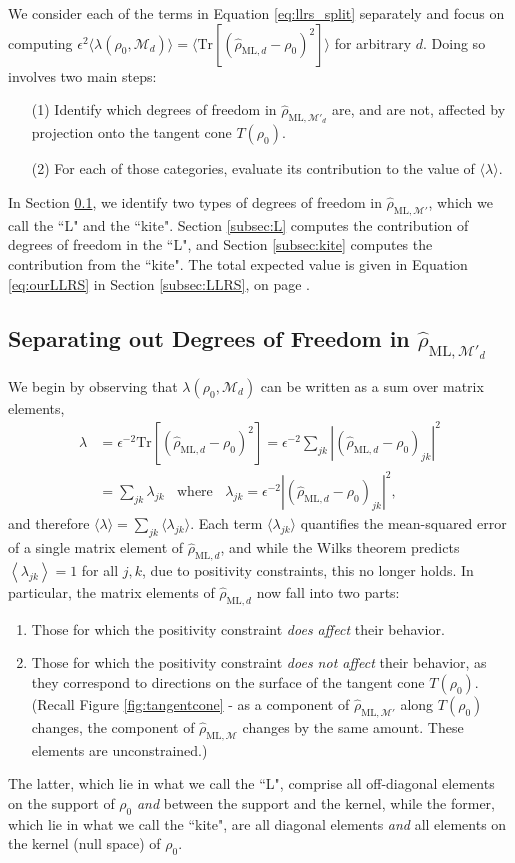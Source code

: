 \documentclass[aps,pra, twocolumn]{revtex4-1}
\newcommand{\M}{\mathcal{M}}
\newcommand{\expect}[1]{\ensuremath{\left\langle#1\right\rangle}}
\newcommand{\rhohat}{\hat{\rho}}
\newcommand{\rhoML}[1]{\rhohat_{\scriptscriptstyle{\mathrm{ML},#1}}}
\begin{document}
We consider each of the terms in Equation \eqref{eq:llrs_split} separately and focus on computing $\epsilon^{2}\langle \lambda(\rho_{0}, \M_{d}) \rangle = \langle \mathrm{Tr}[(\rhoML{d}  - \rho_{0})^{2}] \rangle$ for arbitrary $d$.
Doing so involves two main steps:
\begin{itemize}
\item[(1)] Identify which degrees of freedom in $\rhoML{\M'_{d}}$ are, and are not, affected by projection onto the tangent cone $T(\rho_{0})$.
\item[(2)] For each of those categories, evaluate its contribution to the value of $\langle \lambda \rangle$.
\end{itemize}

In Section \ref{subsec:dof}, we identify two types of degrees of freedom in $\rhoML{\M'}$, which we call the ``L" and the ``kite". Section \ref{subsec:L} computes the contribution of degrees of freedom in the ``L", and Section \ref{subsec:kite} computes the contribution from the ``kite". The total expected value is given in Equation \eqref{eq:ourLLRS} in Section \ref{subsec:LLRS}, on page \pageref{eq:ourLLRS}.

\subsection{Separating out Degrees of Freedom in $\rhoML{\M'_{d}}$}
\label{subsec:dof}
We begin by observing that $\lambda(\rho_{0}, \M_{d})$ can be written as a sum over matrix elements,
\begin{align}
\nonumber \lambda &=\epsilon^{-2}\mathrm{Tr}[(\rhoML{d} - \rho_{0})^{2}] = \epsilon^{-2}\sum_{jk}|(\rhoML{d}- \rho_{0} )_{jk}|^{2}\\
\nonumber &= \sum_{jk}\lambda_{jk}~~~~\text{where}~~~~\lambda_{jk} = \epsilon^{-2}|(\rhoML{d} - \rho_{0} )_{jk} |^{2},
\end{align}
and therefore $\langle \lambda \rangle = \sum_{jk}\langle\lambda_{jk}\rangle$.  Each term $\langle \lambda_{jk}\rangle$ quantifies the mean-squared error of a single matrix element of $\rhoML{d}$, and while the Wilks theorem predicts $\expect{\lambda_{jk}}=1$ for all $j,k$, due to positivity constraints, this no longer holds. In particular, the matrix elements of $\rhoML{d}$ now fall into two parts:

\begin{enumerate}[noitemsep]
\item Those for which the positivity constraint \emph{does affect} their behavior.
\item Those for which the positivity constraint \emph{does not affect} their behavior, as they correspond to directions on the surface of the tangent cone $T(\rho_{0})$. (Recall Figure \ref{fig:tangentcone} - as a component of $\rhoML{\M'}$ along $T(\rho_{0})$ changes, the component of $\rhoML{\M}$ changes by the same amount. These elements are unconstrained.)
\end{enumerate}
The latter, which lie in what we call the ``L", comprise all off-diagonal elements on the support of $\rho_0$ \emph{and} between the support and the kernel, while the former, which lie in what we call the ``kite", are all diagonal elements \emph{and} all elements on the kernel (null space) of $\rho_0$.
\end{document}
